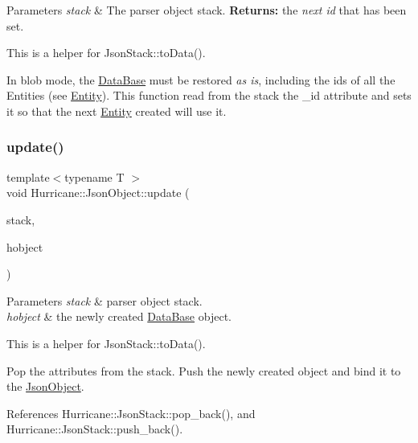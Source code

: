 \begin{DoxyParams}{Parameters}
{\em stack} & The parser object stack. {\bfseries Returns\+:} the {\itshape next id} that has been set.\\
\hline
\end{DoxyParams}
This is a helper for Json\+Stack\+::to\+Data().

In blob mode, the \hyperlink{classHurricane_1_1DataBase}{Data\+Base} must be restored {\itshape as is}, including the {\ttfamily ids} of all the Entities (see \hyperlink{classHurricane_1_1Entity}{Entity}). This function read from the stack the {\ttfamily \+\_\+id} attribute and sets it so that the next \hyperlink{classHurricane_1_1Entity}{Entity} created will use it. \mbox{\label{classHurricane_1_1JsonObject_ace589494452d9d797506286613642cd4}} 
\subsubsection{\texorpdfstring{update()}{update()}}
{\footnotesize\ttfamily template$<$typename T $>$ \\
void Hurricane\+::\+Json\+Object\+::update (\begin{DoxyParamCaption}\item[{\hyperlink{classHurricane_1_1JsonStack}{Json\+Stack} \&}]{stack,  }\item[{T}]{hobject }\end{DoxyParamCaption})\hspace{0.3cm}{\ttfamily [inline]}}


\begin{DoxyParams}{Parameters}
{\em stack} & parser object stack. \\
\hline
{\em hobject} & the newly created \hyperlink{classHurricane_1_1DataBase}{Data\+Base} object.\\
\hline
\end{DoxyParams}
This is a helper for Json\+Stack\+::to\+Data().

Pop the attributes from the stack. Push the newly created object and bind it to the \hyperlink{classHurricane_1_1JsonObject}{Json\+Object}. 

References Hurricane\+::\+Json\+Stack\+::pop\+\_\+back(), and Hurricane\+::\+Json\+Stack\+::push\+\_\+back().

